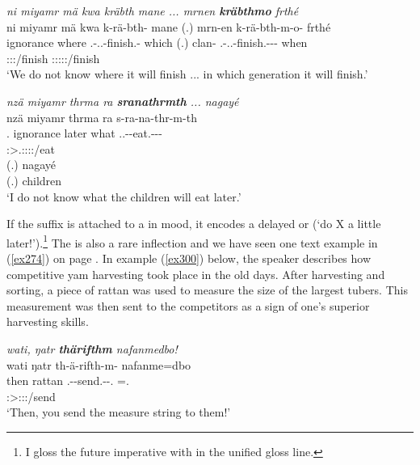 \begin{exe}
	\ex \emph{ni miyamr mä kwa kräbth mane ... mrnen \textbf{kräbthmo} frthé}\\
	\glll ni miyamr mä kwa k-rä-bth-\Zero{} mane (.) mrn-en k-rä-bth-m-o-\Zero{} frthé\\
	\Fnsg{} ignorance where \Fut{} \M.\Bet-\Irr.\Vc.\Ndu-finish.\Rs-\Stsg{} which (.) clan-\Loc{} \M.\Bet-\Irr.\Vc.\Ndu-finish.\Rs-\Dur-\Andat-\Sg{} when\\
	{} {} {} {} \footnotesize{\Stsg:\Sbj:\Irr:\Pfv/finish} {} {} {} \footnotesize{\Sg:\Sbj:\Irr:\Pfv:\Bg:\Andat/finish} {}\\
	\trans `We do not know where it will finish ... in which generation it will finish.'\\ 
	\label{ex298}
\end{exe}
\begin{exe}
	\ex \emph{nzä miyamr thrma ra \textbf{sranathrmth} ... nagayé}\\
	\glll nzä miyamr thrma ra s-ra-na-thr-m-th\\
	\Fsg.\Abs{} ignorance later what \Tsg.\Masc.\Bet-\Irr-eat.\Ext-\Ndu-\Dur-\Stnsg{}\\
	{} {} {} {} \footnotesize{\Stpl:\Sbj>\Tsg.\Masc:\Obj:\Irr:\Ipfv:\Bg/eat}\\
	\sn
	\gll (.) nagayé\\
	(.) children\\
	\trans `I do not know what the children will eat later.' 
	\label{ex299}
\end{exe}

If the  suffix is attached to a  in  mood, it encodes a delayed or   (`do X a little later!').\footnote{I gloss the future imperative with \Futimp{} in the unified gloss line.} The   is also a rare inflection and we have seen one text example in (\ref{ex274}) on page \pageref{ex274}. In example (\ref{ex300}) below, the speaker describes how competitive yam harvesting took place in the old days. After harvesting and sorting, a piece of rattan was used to measure the size of the largest tubers. This measurement was then sent to the competitors as a sign of one's superior harvesting skills.

\begin{exe}
 	\ex \emph{wati, ŋatr \textbf{thärifthm} nafanmedbo!}\\
 	\glll wati ŋatr th-ä-rifth-m-\Zero{} nafanme=dbo\\
 	then rattan \Stnsg.\Bet-\Ndu-send.\Rs-\Dur-\Ssg.\Imp{} \Tnsg=\All.\Sg{}\\
	{} {} \footnotesize{\Ssg:\Sbj>\Stpl:\Obj:\Futimp:\Pfv/send} {}\\
 	\trans `Then, you send the measure string to them!' 
 	\label{ex300}
\end{exe}


